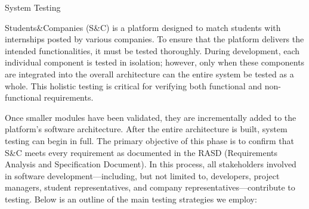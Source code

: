 System Testing

Students\&Companies (S\&C) is a platform designed to match students with internships posted by various companies. To ensure that the platform delivers the intended functionalities, it must be tested thoroughly. During development, each individual component is tested in isolation; however, only when these components are integrated into the overall architecture can the entire system be tested as a whole. This holistic testing is critical for verifying both functional and non-functional requirements.

Once smaller modules have been validated, they are incrementally added to the platform’s software architecture. After the entire architecture is built, system testing can begin in full. The primary objective of this phase is to confirm that S\&C meets every requirement as documented in the RASD (Requirements Analysis and Specification Document). In this process, all stakeholders involved in software development—including, but not limited to, developers, project managers, student representatives, and company representatives—contribute to testing. Below is an outline of the main testing strategies we employ:

